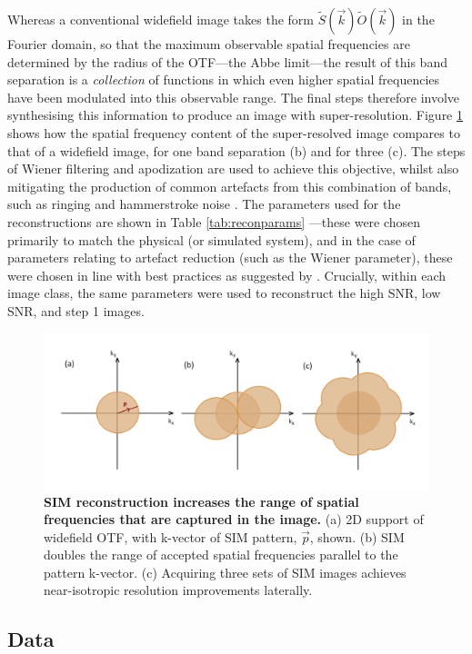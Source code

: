 \documentclass[12pt]{article}
\begin{document}
Whereas a conventional widefield image takes the form $\tilde{S}(\vec{k})\tilde{O}(\vec{k})$ in the Fourier domain,
so that the maximum observable spatial frequencies are determined by the radius of the OTF---the Abbe limit---the
result of this band separation is a \textit{collection} of functions in which even higher spatial frequencies have been modulated into this observable range.
The final steps therefore involve synthesising this information to produce an image with super-resolution.
Figure \ref{fig:SIM_otf} shows how the spatial frequency content of the super-resolved image compares to that of a widefield image,
for one band separation (b) and for three (c).
The steps of Wiener filtering and apodization are used to achieve this objective,
whilst also mitigating the production of common artefacts from this combination of bands,
such as ringing and hammerstroke noise \cite{params}.
The parameters used for the reconstructions are shown in Table \ref{tab:reconparams}
---these were chosen primarily to match the physical (or simulated system),
and in the case of parameters relating to artefact reduction (such as the Wiener parameter),
these were chosen in line with best practices as suggested by \cite{params}.
Crucially, within each image class, the same parameters were used to reconstruct the high SNR, low SNR, and step 1 images.

\begin{figure}[hbtp]
    \includegraphics[scale=0.45, center]{figures/SIM_otf.png}
    \caption{\textbf{SIM reconstruction increases the range of spatial frequencies that are captured in the image.}
    (a) 2D support of widefield OTF, with k-vector of SIM pattern, $\vec{p}$, shown.
    (b) SIM doubles the range of accepted spatial frequencies parallel to the pattern k-vector.
    (c) Acquiring three sets of SIM images achieves near-isotropic resolution improvements laterally.}
    \label{fig:SIM_otf}
\end{figure}


\subsection{Data}
\end{document}
